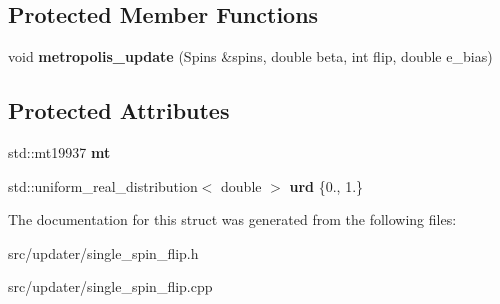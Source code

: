 \subsection*{Protected Member Functions}
\begin{DoxyCompactItemize}
\item 
\mbox{\label{structopenjij_1_1updater_1_1_single_spin_flip_a2a65df51711d25ec8455e433aa0328ad}} 
void {\bfseries metropolis\+\_\+update} (Spins \&spins, double beta, int flip, double e\+\_\+bias)
\end{DoxyCompactItemize}
\subsection*{Protected Attributes}
\begin{DoxyCompactItemize}
\item 
\mbox{\label{structopenjij_1_1updater_1_1_single_spin_flip_aee12f5270888d3297a738054704b6697}} 
std\+::mt19937 {\bfseries mt}
\item 
\mbox{\label{structopenjij_1_1updater_1_1_single_spin_flip_ae3af58aea3b554be2baf53c41f53b87d}} 
std\+::uniform\+\_\+real\+\_\+distribution$<$ double $>$ {\bfseries urd} \{0., 1.\}
\end{DoxyCompactItemize}


The documentation for this struct was generated from the following files\+:\begin{DoxyCompactItemize}
\item 
src/updater/single\+\_\+spin\+\_\+flip.\+h\item 
src/updater/single\+\_\+spin\+\_\+flip.\+cpp\end{DoxyCompactItemize}
